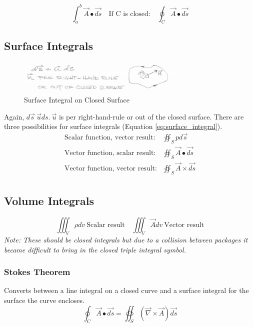 \documentclass[draft=false, titlepage]{article}
\newcommand{\gradient}{\vec{\nabla}}
\begin{document}
\begin{equation}
    \int_a^b\vec{A}\bullet \vec{ds}\quad \text{If C is closed:} \quad \oint_C \vec{A}\bullet \vec{ds}
    \label{eq:line_integral}
\end{equation}

\subsection{Surface Integrals}
\begin{figure}[ht]
    \centering
    \includegraphics[width=0.7\textwidth]{Figures/surface_integrals.PNG}
    \caption{Surface Integral on Closed Surface}
    \label{fig:surface_integral}
\end{figure}

Again, $d\vec{s} \ \vec{u}ds.\ \vec{u}$ is per right-hand-rule or out of the closed surface. There are three possibilities for surface integrals (Equation \ref{eq:surface_integral}).
\begin{equation}
    \begin{array}{lc}
         \text{Scalar function, vector result:} & \oiint_S p d\vec{s} \\
         \text{Vector function, scalar result:} & \oiint_S \vec{A}\bullet\vec{ds} \\
         \text{Vector function, vector result:} & \oiint_S \vec{A} \times \vec{ds} \\
    \end{array}
    \label{eq:surface_integral}
\end{equation}

\subsection{Volume Integrals}
\begin{equation}
    \iiint_V \rho dv\ \text{Scalar result} \quad \iiint_V \vec{A}dv\ \text{Vector result}
\end{equation}
\textit{Note: These should be closed integrals but due to a collision between packages it became difficult to bring in the closed triple integral symbol.}

\subsubsection{Stokes Theorem}
Converts between a line integral on a closed curve and a surface integral for the surface the curve encloses.
\begin{equation}
    \oint_C \vec{A} \bullet \vec{ds} = \oiint_S (\gradient \times \vec{A})\vec{ds}
\end{equation}
\end{document}
